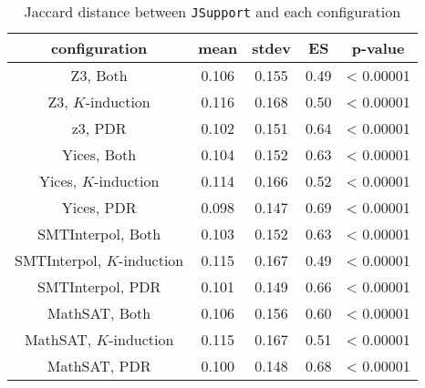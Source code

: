 \begin{table}
  \centering
  \begin{tabular}{|c|c|c|c|c|}
    \hline
    configuration & mean & stdev & ES & p-value \\[0.5ex]
    \hline\hline
    Z3, Both  & 0.106 & 0.155 & 0.49 & < 0.00001\\[0.5ex] %
    Z3, $K$-induction & 0.116 & 0.168 & 0.50 & < 0.00001\\[0.5ex]
    z3, PDR  & 0.102 & 0.151 & 0.64 & < 0.00001\\[0.5ex]
    \hline
    Yices, Both & 0.104 & 0.152 & 0.63& < 0.00001 \\[0.5ex]
    Yices, $K$-induction  & 0.114 & 0.166 & 0.52 & < 0.00001 \\[0.5ex]
    Yices, PDR  & 0.098 & 0.147 & 0.69 & < 0.00001\\[0.5ex]
    \hline
    SMTInterpol, Both  & 0.103 & 0.152 & 0.63 & < 0.00001\\[0.5ex]
    SMTInterpol, $K$-induction  & 0.115 & 0.167 & 0.49 & < 0.00001\\[0.5ex]
    SMTInterpol, PDR  & 0.101 & 0.149 & 0.66 & < 0.00001\\[0.5ex]
    \hline
    MathSAT, Both  & 0.106 & 0.156 & 0.60 & < 0.00001\\[0.5ex]
    MathSAT, $K$-induction & 0.115 & 0.167 &0.51 & < 0.00001\\[0.5ex]
    MathSAT, PDR & 0.100 & 0.148 & 0.68  &< 0.00001\\[0.5ex]
    \hline
  \end{tabular}
  \caption{Jaccard distance between \texttt{JSupport} and each configuration}\label{tab:jsupconf}
\end{table}

\vspace{6pt}
\noindent{}
 \vspace{6pt}

